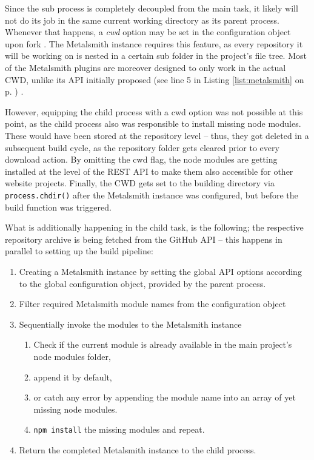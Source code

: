 Since the sub process is completely decoupled from the main task, it likely will not do its job in the same current working directory as its parent process. Whenever that happens, a \emph{cwd} option may be set in the configuration object upon fork \cite{NodejsChildProcesses}. The Metalsmith instance requires this feature, as every repository it will be working on is nested in a certain sub folder in the project's file tree. Most of the Metalsmith plugins are moreover designed to only work in the actual CWD, unlike its API initially proposed (see line 5 in Listing \ref{list:metalsmith} on p. \pageref{list:metalsmith}) \cite{MetalsmithRepository}.

However, equipping the child process with a cwd option was not possible at this point, as the child process also was responsible to install missing node modules. These would have been stored at the repository level -- thus, they got deleted in a subsequent build cycle, as the repository folder gets cleared prior to every download action. By omitting the cwd flag, the node modules are getting installed at the level of the REST API to make them also accessible for other website projects. Finally, the CWD gets set to the building directory via \texttt{process.chdir()} after the Metalsmith instance was configured, but before the build function was triggered.

What is additionally happening in the child task, is the following; the respective repository archive is being fetched from the GitHub API -- this happens in parallel to setting up the build pipeline:

\begin{enumerate}
  \item Creating a Metalsmith instance by setting the global API options according to the global configuration object, provided by the parent process.
  \item Filter required Metalsmith module names from the configuration object
  \item Sequentially invoke the modules to the Metalsmith instance
  \begin{enumerate}
    \item Check if the current module is already available in the main project's node modules folder,
    \item append it by default,
    \item or catch any error by appending the module name into an array of yet missing node modules.
    \item \texttt{npm install} the missing modules and repeat.
  \end{enumerate}
  \item Return the completed Metalsmith instance to the child process.
\end{enumerate}

